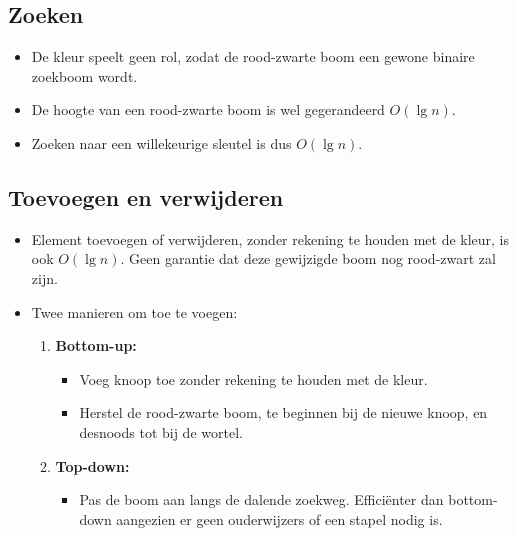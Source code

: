 \subsection{Zoeken}
\begin{itemize}
    \item De kleur speelt geen rol, zodat de rood-zwarte boom een gewone binaire zoekboom wordt.
    \item De hoogte van een rood-zwarte boom is wel gegerandeerd $O(\lg n)$.
    \item Zoeken naar een willekeurige sleutel is dus $O(\lg n)$.
\end{itemize}

\subsection{Toevoegen en verwijderen}
\begin{itemize}
    \item Element toevoegen of verwijderen, zonder rekening te houden met de kleur, is ook $O(\lg n)$.
    \alert Geen garantie dat deze gewijzigde boom nog rood-zwart zal zijn.
    \item Twee manieren om toe te voegen:
    \begin{enumerate}
        \item \textbf{Bottom-up:} 
        \begin{itemize}
            \item Voeg knoop toe zonder rekening te houden met de kleur.
            \item Herstel de rood-zwarte boom, te beginnen bij de nieuwe knoop, en desnoods tot bij de wortel.
        \end{itemize}
        \item \textbf{Top-down:} 
        \begin{itemize}
            \item Pas de boom aan langs de dalende zoekweg.
            \good Efficiënter dan bottom-down aangezien er geen ouderwijzers of een stapel nodig is.
        \end{itemize}
    \end{enumerate}
\end{itemize}

